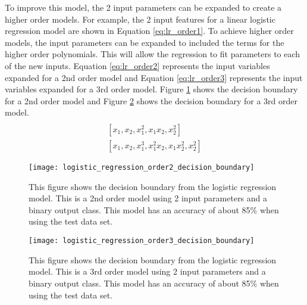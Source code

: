 To improve this model, the 2 input parameters can be expanded to create a higher order models.  For example, the 2 input features for a linear logistic regression model are shown in Equation \ref{eq:lr_order1}.  To achieve higher order models, the input parameters can be expanded to included the terms for the higher order polynomials.  This will allow the regression to fit parameters to each of the new inputs.  Equation \ref{eq:lr_order2} represents the input variables expanded for a 2nd order model and Equation \ref{eq:lr_order3} represents the input variables expanded for a 3rd order model.  Figure \ref{fig:logistic_regression_order2_decision_boundary} shows the decision boundary for a 2nd order model and Figure \ref{fig:logistic_regression_order3_decision_boundary} shows the decision boundary for a 3rd order model.
\begin{align}
	[x_1, x_2]  \label{eq:lr_order1} \\
	[x_1, x_2, x_1^2, x_1 x_2, x_2^2] \label{eq:lr_order2} \\
	[x_1, x_2, x_1^3, x_1^2 x_2, x_1 x_2^2, x_2^2] \label{eq:lr_order3}
\end{align}

\begin{figure}
	\centering
	\texttt{[image: logistic\_regression\_order2\_decision\_boundary]}
	\decoRule
	\caption{This figure shows the decision boundary from the logistic regression model.  This is a 2nd order model using 2 input parameters and a binary output class.  This model has an accuracy of about 85\% when using the test data set.}
	\label{fig:logistic_regression_order2_decision_boundary}
\end{figure}

\begin{figure}
	\centering
	\texttt{[image: logistic\_regression\_order3\_decision\_boundary]}
	\decoRule
	\caption{This figure shows the decision boundary from the logistic regression model.  This is a 3rd order model using 2 input parameters and a binary output class.  This model has an accuracy of about 85\% when using the test data set.}
	\label{fig:logistic_regression_order3_decision_boundary}
\end{figure}

